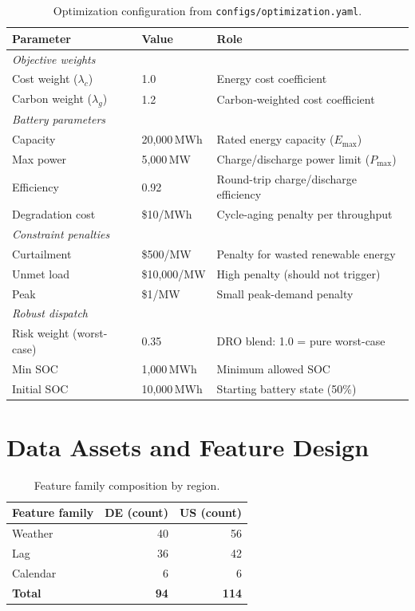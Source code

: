\documentclass[11pt,a4paper]{article}
\begin{document}
\begin{table}[htbp]
\centering\small
\caption{Optimization configuration from \texttt{configs/optimization.yaml}.}
\label{tab:optim_config}
\begin{tabular}{p{4.0cm}p{2.0cm}p{6.5cm}}
\toprule
Parameter & Value & Role \\
\midrule
\multicolumn{3}{l}{\textit{Objective weights}} \\
\quad Cost weight ($\lambda_c$) & 1.0 & Energy cost coefficient \\
\quad Carbon weight ($\lambda_g$) & 1.2 & Carbon-weighted cost coefficient \\
\midrule
\multicolumn{3}{l}{\textit{Battery parameters}} \\
\quad Capacity & 20{,}000\,MWh & Rated energy capacity ($E_{\max}$) \\
\quad Max power & 5{,}000\,MW & Charge/discharge power limit ($P_{\max}$) \\
\quad Efficiency & 0.92 & Round-trip charge/discharge efficiency \\
\quad Degradation cost & \$10/MWh & Cycle-aging penalty per throughput \\
\midrule
\multicolumn{3}{l}{\textit{Constraint penalties}} \\
\quad Curtailment & \$500/MW & Penalty for wasted renewable energy \\
\quad Unmet load & \$10{,}000/MW & High penalty (should not trigger) \\
\quad Peak & \$1/MW & Small peak-demand penalty \\
\midrule
\multicolumn{3}{l}{\textit{Robust dispatch}} \\
\quad Risk weight (worst-case) & 0.35 & DRO blend: 1.0 = pure worst-case \\
\quad Min SOC & 1{,}000\,MWh & Minimum allowed SOC \\
\quad Initial SOC & 10{,}000\,MWh & Starting battery state (50\%) \\
\bottomrule
\end{tabular}
\end{table}

\section{Data Assets and Feature Design}\label{app:data_assets}

\begin{table}[htbp]
\centering\small
\caption{Feature family composition by region.}
\label{tab:feature_composition}
\begin{tabular}{lrr}
\toprule
Feature family & DE (count) & US (count) \\
\midrule
Weather & 40 & 56 \\
Lag & 36 & 42 \\
Calendar & 6 & 6 \\
\midrule
\textbf{Total} & \textbf{94} & \textbf{114} \\
\bottomrule
\end{tabular}
\end{table}
\end{document}

